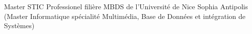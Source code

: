 %
%
%


\begin{scholarship}
					{Master STIC Professionel filière MBDS de l'Université de Nice Sophia Antipolis (Master Informatique spécialité Multimédia, Base de Données et intégration de Systèmes)}

\end{scholarship}